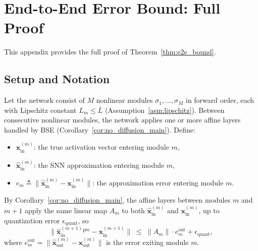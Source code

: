 \documentclass{article}
\theoremstyle{plain}
\theoremstyle{definition}
\theoremstyle{remark}
\begin{document}



\appendix

\section{End-to-End Error Bound: Full Proof}
\label{app:e2e_proof}

This appendix provides the full proof of Theorem~\ref{thm:e2e_bound}.

\subsection{Setup and Notation}

Let the network consist of $M$ nonlinear modules $\sigma_1, \ldots, \sigma_M$ in
forward order, each with Lipschitz constant $L_m \le \bar{L}$ (Assumption~\ref{asm:lipschitz}).
Between consecutive nonlinear modules, the network applies one or more affine layers
handled by BSE (Corollary~\ref{cor:no_diffusion_main}). Define:
\begin{itemize}
  \item $\mathbf{x}^{(m)}_\mathrm{in}$: the true activation vector entering module $m$,
  \item $\hat{\mathbf{x}}^{(m)}_\mathrm{in}$: the SNN approximation entering module $m$,
  \item $e_m \triangleq \|\hat{\mathbf{x}}^{(m)}_\mathrm{in} - \mathbf{x}^{(m)}_\mathrm{in}\|$:
        the approximation error entering module $m$.
\end{itemize}
By Corollary~\ref{cor:no_diffusion_main}, the affine layers between modules $m$ and
$m+1$ apply the same linear map $A_m$ to both $\hat{\mathbf{x}}^{(m)}_\mathrm{in}$
and $\mathbf{x}^{(m)}_\mathrm{in}$, up to quantization error $\epsilon_\mathrm{quant}$,
so
\begin{equation}
\label{eq:linear_passthrough}
\|\hat{\mathbf{x}}^{(m+1)}_\mathrm{in}^\mathrm{pre} - \mathbf{x}^{(m+1)}_\mathrm{in}\|
\;\le\; \|A_m\| \cdot e_m^\mathrm{out} + \epsilon_\mathrm{quant},
\end{equation}
where $e_m^\mathrm{out} = \|\hat{\mathbf{x}}^{(m)}_\mathrm{out} -
\mathbf{x}^{(m)}_\mathrm{out}\|$ is the error exiting module $m$.
\end{document}
